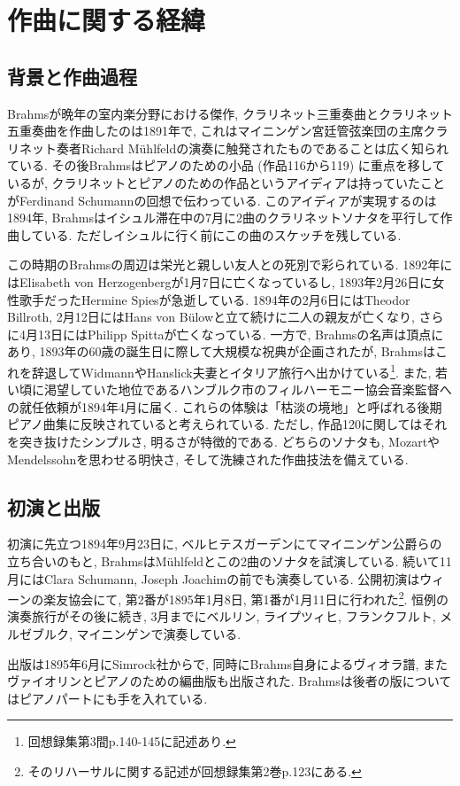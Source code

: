 
\chapter{作曲に関する経緯}

\section{背景と作曲過程}

Brahmsが晩年の室内楽分野における傑作, クラリネット三重奏曲とクラリネット五重奏曲を作曲したのは1891年で,
これはマイニンゲン宮廷管弦楽団の主席クラリネット奏者Richard Mühlfeldの演奏に触発されたものであることは広く知られている.
その後Brahmsはピアノのための小品 (作品116から119) に重点を移しているが,
クラリネットとピアノのための作品というアイディアは持っていたことがFerdinand Schumannの回想で伝わっている\cite{library}.
このアイディアが実現するのは1894年, Brahmsはイシュル滞在中の7月に2曲のクラリネットソナタを平行して作曲している\cite{compos}.
ただしイシュルに行く前にこの曲のスケッチを残している\cite{library}.

この時期のBrahmsの周辺は栄光と親しい友人との死別で彩られている.
1892年にはElisabeth von Herzogenbergが1月7日に亡くなっているし, 1893年2月26日に女性歌手だったHermine Spiesが急逝している.
1894年の2月6日にはTheodor Billroth, 2月12日にはHans von Bülowと立て続けに二人の親友が亡くなり, さらに4月13日にはPhilipp Spittaが亡くなっている.
一方で, Brahmsの名声は頂点にあり, 1893年の60歳の誕生日に際して大規模な祝典が企画されたが,
Brahmsはこれを辞退してWidmannやHanslick夫妻とイタリア旅行へ出かけている\footnote{回想録集第3間p.140-145に記述あり.}.
また, 若い頃に渇望していた地位であるハンブルク市のフィルハーモニー協会音楽監督への就任依頼が1894年4月に届く.
これらの体験は「枯淡の境地」と呼ばれる後期ピアノ曲集に反映されていると考えられている.
ただし, 作品120に関してはそれを突き抜けたシンプルさ, 明るさが特徴的である.
どちらのソナタも, MozartやMendelssohnを思わせる明快さ, そして洗練された作曲技法を備えている.


\section{初演と出版}

初演に先立つ1894年9月23日に, ベルヒテスガーデンにてマイニンゲン公爵らの立ち合いのもと, BrahmsはMühlfeldとこの2曲のソナタを試演している\cite{compos}.
続いて11月にはClara Schumann, Joseph Joachimの前でも演奏している\cite{henle}.
公開初演はウィーンの楽友協会にて, 第2番が1895年1月8日, 第1番が1月11日に行われた\footnote{そのリハーサルに関する記述が回想録集第2巻p.123にある.}\cite{library}.
恒例の演奏旅行がその後に続き, 3月までにベルリン, ライプツィヒ, フランクフルト, メルゼブルク, マイニンゲンで演奏している\cite{compos}.


出版は1895年6月にSimrock社からで, 同時にBrahms自身によるヴィオラ譜, またヴァイオリンとピアノのための編曲版も出版された\cite{imslp}.
Brahmsは後者の版についてはピアノパートにも手を入れている.
